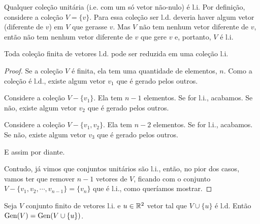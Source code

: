 \begin{rmk}
	Qualquer coleção unitária (i.e. com um só vetor não-nulo) é l.i. Por definição, considere a coleção $V=\{v\}$. Para essa coleção ser l.d. deveria haver algum vetor (diferente de $v$) em $V$ que gerasse $v$. Mas $V$ não tem nenhum vetor diferente de $v$, então não tem nenhum vetor diferente de $v$ que gere $v$ e, portanto, $V$ é l.i.
\end{rmk}

\begin{lemma}\label{lem:ld reduz pra li}
	Toda coleção finita de vetores l.d. pode ser reduzida em uma coleção l.i.
\end{lemma}
\begin{proof}
	Se a coleção $V$ é finita, ela tem uma quantidade de elementos, $n$. Como a coleção é l.d., existe algum vetor $v_1$ que é gerado pelos outros.
	
	Considere a coleção $V-\{v_1\}$. Ela tem $n-1$ elementos. Se for l.i., acabamos. Se não, existe algum vetor $v_2$ que é gerado pelos outros.
	
	Considere a coleção $V-\{v_1,v_2\}$. Ela tem $n-2$ elementos. Se for l.i., acabamos. Se não, existe algum vetor $v_3$ que é gerado pelos outros.
	
	E assim por diante.
	
	Contudo, já vimos que conjuntos unitários são l.i., então, no pior dos casos, vamos ter que remover $n-1$ vetores de $V$, ficando com o conjunto $V-\{v_1,v_2,\cdots,v_{n-1}\}=\{v_n\}$ que é l.i., como queríamos mostrar.
\end{proof}
\begin{lemma}\label{lem:ld sub li gen}
	Seja $V$ conjunto finito de vetores l.i. e $u\in\mathbb R^2$ vetor tal que $V\cup\{u\}$ é l.d. Então $\operatorname{Gen} (V)=\operatorname{Gen}(V\cup\{u\})$. 
\end{lemma}
